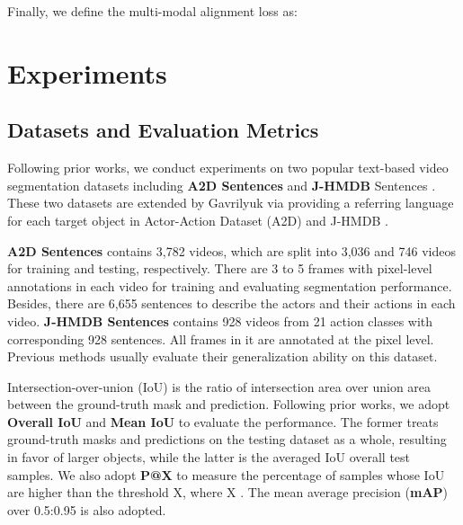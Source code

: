 \documentclass[10pt,twocolumn,letterpaper]{article}
\begin{document}
Finally, we define the multi-modal alignment loss as:
 

















\vspace{-4mm}
\section{Experiments}
\vspace{-1mm}  
\subsection{Datasets and Evaluation Metrics}
\vspace{-2mm}
Following prior works, we conduct experiments on two popular text-based video segmentation datasets including  \textbf{A2D Sentences} \cite{gavrilyuk2018actor} and \textbf{J-HMDB} Sentences \cite{gavrilyuk2018actor}. These two datasets are extended by Gavrilyuk \etal \cite{gavrilyuk2018actor} via providing a referring language for each target object in Actor-Action Dataset (A2D) \cite{xu2015can} and J-HMDB \cite{jhuang2013towards}. 



\textbf{A2D Sentences} contains 3,782 videos, which are split into 3,036 and 746 videos for training and testing, respectively. There are 3 to 5 frames with pixel-level annotations in each video for training and evaluating segmentation performance. Besides, there are 6,655 sentences to describe the actors and their actions in each video. \textbf{J-HMDB Sentences} contains 928 videos from 21 action classes with corresponding 928 sentences. All frames in it are annotated at the pixel level. Previous methods usually evaluate their generalization ability on this dataset. 
 
 
Intersection-over-union (IoU) is the ratio of intersection area over union area between the ground-truth mask and prediction. Following prior works, we adopt \textbf{Overall IoU} and \textbf{Mean IoU} to evaluate the performance. The former treats ground-truth masks and predictions on the testing dataset as a whole, resulting in favor of larger objects, while the latter is the averaged IoU overall test samples. We also adopt \textbf{P@X} to measure the percentage of samples whose IoU are higher than the threshold X, where X . The mean average precision (\textbf{mAP}) over 0.5:0.95 is also adopted.
 
\end{document}
